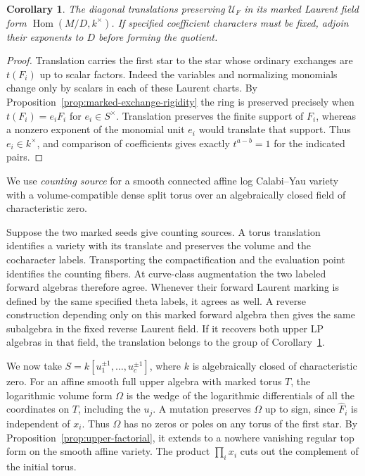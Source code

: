 \documentclass[11pt,reqno]{amsart}
\numberwithin{equation}{section}
\newtheorem{corollary}[theorem]{Corollary}
\theoremstyle{definition}
\theoremstyle{remark}
\begin{document}
\begin{corollary}\label{cor:diagonal-exchange-stabilizer}
The diagonal translations preserving \(\mathcal U_F\) in its marked
Laurent field form \(\operatorname{Hom}(M/D,k^\times)\).
If specified coefficient characters must be fixed, adjoin their
exponents to \(D\) before forming the quotient.
\end{corollary}
\begin{proof}
Translation carries the first star to the star whose ordinary
exchanges are \(t(F_i)\) up to scalar factors. Indeed the variables
and normalizing monomials change only by scalars in each of these
Laurent charts. By Proposition~\ref{prop:marked-exchange-rigidity}
the ring is preserved precisely when \(t(F_i)=e_iF_i\) for
\(e_i\in S^\times\). Translation preserves the finite support of
\(F_i\), whereas a nonzero exponent of the monomial unit \(e_i\) would
translate that support. Thus \(e_i\in k^\times\), and comparison of
coefficients gives exactly \(t^{a-b}=1\) for the indicated pairs.
\end{proof}

We use \emph{counting source} for a smooth connected affine log
Calabi--Yau variety with a volume-compatible dense split torus over
an algebraically closed field of characteristic zero.

Suppose the two marked seeds give counting sources. A torus translation
identifies a variety with its translate and preserves the
volume and the cocharacter labels. Transporting the compactification
and the evaluation point identifies the counting fibers. At curve-class
augmentation the two labeled forward algebras therefore agree.
Whenever their forward Laurent marking is defined by the same
specified theta labels, it agrees as well. A reverse construction
depending only on this marked forward algebra then gives the same
subalgebra in the fixed reverse Laurent field. If it recovers both
upper LP algebras in that field, the translation belongs to the
group of Corollary~\ref{cor:diagonal-exchange-stabilizer}.

We now take \(S=k[u_1^{\pm1},\ldots,u_c^{\pm1}]\), where \(k\) is
algebraically closed of characteristic zero. For an affine smooth
full upper algebra with marked torus \(T\), the logarithmic volume form
\(\Omega\) is the wedge of the logarithmic differentials of all the
coordinates on \(T\), including the \(u_j\). A mutation preserves
\(\Omega\) up to sign, since \(\widehat F_i\) is independent of \(x_i\).
Thus \(\Omega\) has no zeros or poles on any torus of the first star.
By Proposition~\ref{prop:upper-factorial}, it extends to a nowhere
vanishing regular top form on the smooth affine variety. The product \(\prod_i x_i\) cuts out the complement of the initial torus.
\end{document}
